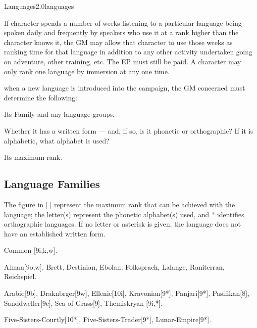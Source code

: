 \begin{skill}{Languages}{2.0}{languages}
\begin{Description}
\item[Immersion] If character spends a number of weeks listening to a
particular language being spoken daily and frequently by speakers who
use it at a rank higher than the character knows it, the GM may allow
that character to use those weeks as ranking time for that language in
addition to any other activity undertaken \eg going on adventure,
other training, etc. The EP must still be paid. A character may only
rank one language by immersion at any one time.

\item[New languages] when a new language is introduced into the
campaign, the GM concerned must determine the following:
\begin{Enumerate}
\item Its Family and any language groups. 

\item Whether it has a written form --- and, if so, is it phonetic or
orthographic? If it is alphabetic, what alphabet is used?

\item Its maximum rank. 
\end{Enumerate}
\end{Description}


\subsection{Language Families}
\label{languages:families}


The figure in [ ] represent the maximum rank that can be achieved with
the language; the letter(s) represent the phonetic alphabet(s) used,
and * identifies orthographic languages. If no letter or asterisk is
given, the language does not have an established written form.

\begin{Description}

\item[Common] Common [9i,k,w].

\item[Western-Human] Alman[9o,w], Brett\-[9o,e], Des\-tin\-ian\-[8w],
Ebolan\-[9w], Folk\-sprach\-[9w], Lalange\-[10w], Rani\-terran\-[9e],
Reich\-spiel\-[9w].

\item[Central-Human] Arabiq[9b], Draknbrger[9w], Ellenic[10i],
Kravonian[9*], Panjari[9*], Pasifikan[8], Sanddweller[9e],
Sea-of-Grass[9], Themiskryan [9i,*].

\item[Eastern-Human] Five-Sisters-Courtly[10*],
Five-Sisters-Trader[9*], Lunar-Empire[9*].


\end{Description}
\end{skill}
